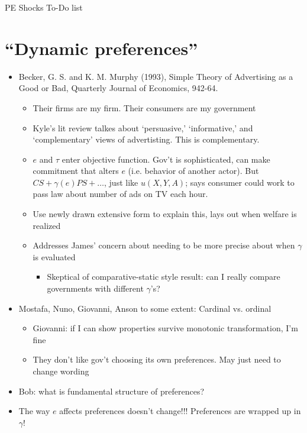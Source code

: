 \documentclass[12pt]{article}
\newcommand{\ga}{\gamma}
\begin{document}
\begin{center}
PE Shocks To-Do list
\end{center}

\section{``Dynamic preferences''}
	\begin{itemize}
		\item Becker, G. S. and K. M. Murphy (1993), Simple Theory of Advertising as a Good or Bad, Quarterly Journal of Economics, 942-64.
			\begin{itemize}
				\item Their firms are my firm. Their consumers are my government
				\item Kyle's lit review talkes about `persuasive,' `informative,' and `complementary' views of advertisting. This is complementary.
				\item $e$ and $\tau$ enter objective function. Gov't is sophisticated, can make commitment that alters $e$ (i.e. behavior of another actor). But $CS + \ga(e)PS + \ldots$, just like $u(X,Y,A)$; says consumer could work to pass law about number of ads on TV each hour.
				\item Use newly drawn extensive form to explain this, lays out when welfare is realized
				\item Addresses James' concern about needing to be more precise about when $\ga$ is evaluated
					\begin{itemize}
						\item Skeptical of comparative-static style result: can I really compare governments with different $\ga$'s?
					\end{itemize}
			\end{itemize}
		\item Mostafa, Nuno, Giovanni, Anson to some extent: Cardinal vs. ordinal
				\begin{itemize}
					\item Giovanni: if I can show properties survive  monotonic transformation, I'm fine
					\item They don't like gov't choosing its own preferences. May just need to change wording
				\end{itemize}
		\item Bob: what is fundamental structure of preferences?
		\item The way $e$ affects preferences doesn't change!!! Preferences are wrapped up in $\ga$!
			\begin{itemize}

\end{itemize}
\end{itemize}
\end{document}
